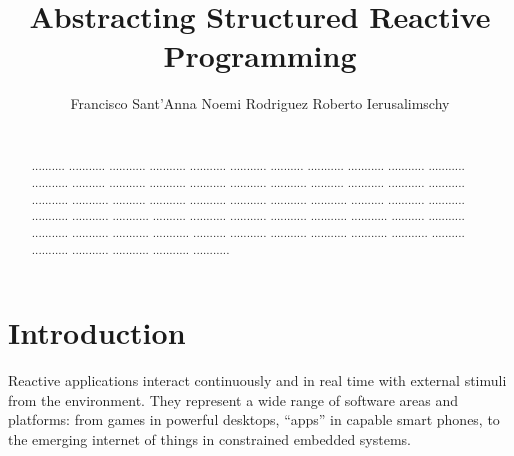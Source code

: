 \documentclass{acm_proc_article-sp}
\newcommand{\1}{\;}
\newcommand{\2}{\;\;}
\newcommand{\3}{\;\;\;}
\newcommand{\5}{\;\;\;\;\;}
\begin{document}
\title {
    Abstracting Structured Reactive Programming
}

\author{
    \alignauthor
    Francisco Sant'Anna \hspace{1cm} Noemi Rodriguez \hspace{1cm} Roberto Ierusalimschy   \\
     \\
}

\maketitle

\begin{abstract}
.......... ........... ........... ........... ........... ...........
.......... ........... ........... ........... ........... ...........
.......... ........... ........... ........... ........... ...........
.......... ........... ........... ........... ........... ...........
.......... ........... ........... ........... ........... ...........
.......... ........... ........... ........... ........... ...........
.......... ........... ........... ........... ........... ...........
.......... ........... ........... ........... ........... ...........
.......... ........... ........... ........... ........... ...........
.......... ........... ........... ........... ........... ...........
\end{abstract}




\section{Introduction}
\label{sec.intro}

Reactive applications interact continuously and in real time with external 
stimuli from the environment.
They represent a wide range of software areas and platforms: from games in 
powerful desktops, ``apps'' in capable smart phones, to the emerging internet 
of things in constrained embedded systems.
\end{document}
